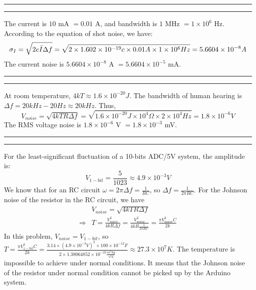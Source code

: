 \documentclass[11pt]{article}
\newcounter{questionCounter}
\newcounter{partCounter}[questionCounter]
\newenvironment{question}[2][\arabic{questionCounter}]{%
    \addtocounter{questionCounter}{1}%
    \setcounter{partCounter}{0}%
    \vspace{.25in} \hrule \vspace{0.5em}%
        \noindent{\bf #2}%
    \vspace{0.8em} \hrule \vspace{.10in}%
}{}
\begin{document}
\begin{question}{Problem 5}
The current is $10$ mA $= 0.01$ A, and bandwidth is $1$ MHz $= 1 \times 10^{6}$ Hz. According to the equation of shot noise, we have:
\begin{equation*}
    \sigma_{I} = \sqrt{2e\Bar{I}\Delta f} = \sqrt{2 \times 1.602 \times 10^{-19} c \times 0.01 A \times 1 \times 10^{6} Hz} = 5.6604 \times 10^{-8} A
\end{equation*}
The current noise is $5.6604 \times 10^{-8}$ A $= 5.6604 \times 10^{-5}$ mA.
\end{question}

\begin{question}{Problem 6}
    At room temperature, $4kT \approx 1.6 \times 10^{-20} J$. The bandwidth of human hearing is  $\Delta f = 20 kHz - 20 Hz \approx 20 kHz$. Thus,
 \begin{equation*}
    V_{noise} = \sqrt{4kTR\Delta f} = \sqrt{1.6 \times 10^{-20} J \times 10^4 \Omega \times 2 \times 10^4 Hz} = 1.8 \times 10^{-6} V
    \end{equation*}   
The RMS voltage noise is $1.8 \times 10^{-6}$ V $= 1.8 \times 10^{-3}$ mV.
\end{question}

\begin{question}{Problem 7}
For the least-significant fluctuation of a 10-bits ADC/5V system, the amplitude is:
\begin{equation*}
    V_{1-bit} = \frac{5}{1023} \approx 4.9 \times 10^{-3} V
\end{equation*}
We know that for an RC circuit $\omega = 2\pi\Delta f = \frac{1}{RC}$, so $\Delta f = \frac{1}{2\pi RC}$. For the Johnson noise of the resistor in the RC circuit, we have
\begin{align*}
    &V_{noise} = \sqrt{4kTR\Delta f} \\
    \Longrightarrow& T = \frac{V_{noise}^2}{4kR\Delta f} = \frac{V_{noise}^2}{4kR \frac{1}{2\pi RC}} = \frac{\pi V_{noise}^2 C}{2k}
\end{align*}
In this problem, $V_{noise} = V_{1-bit}$, so $T = \frac{\pi V_{1-bit}^2 C}{2k} =\frac{3.14 \times (4.9 \times 10^{-3} V)^2 \times 100 \times 10^{-12} F}{2 \times 1.38064852 \times 10^{-23} \frac{m^2 kg}{s^2 k}} \approx 27.3 \times 10^{7} K$. The temperature is impossible to achieve under normal conditions. It means that the Johnson noise of the resistor under normal condition cannot be picked up by the Arduino system.
\end{question}
\end{document}
